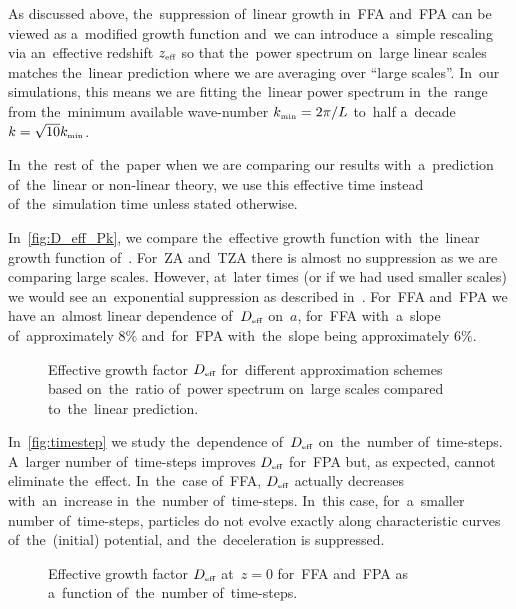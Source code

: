 As discussed above, the~suppression of~linear growth in~FFA and~FPA can be viewed as a~modified growth function and~we can introduce a~simple rescaling via an~effective redshift $z_\text{\tiny eff}$ so that the~power spectrum on~large linear scales matches the~linear prediction
where we are averaging over ``large scales''. In~our simulations, this means we are fitting the~linear power spectrum in~the~range from the~minimum available wave-number $k_\text{\tiny min}=2\pi/L$ to~half a~decade $k=\sqrt{10}k_\text{\tiny min}$.

In~the~rest of~the~paper when we are comparing our results with~a~prediction of~the~linear or non-linear theory, we use this effective time instead of~the~simulation time unless stated otherwise.

In~\autoref{fig:D_eff_Pk}, we compare the~effective growth function with~the~linear growth function of~\LCDM. For~ZA and~TZA there is almost no suppression as we are comparing large scales. However, at~later times (or if we had used smaller scales) we would see an~exponential suppression as described in~\cite{Bharadwaj_1996}. For~FFA and~FPA we have an~almost linear dependence of~$D_\text{\tiny eff}$ on~$a$, for~FFA with~a~slope of~approximately $8\%$ and~for~FPA with~the~slope being approximately $6\%$.
\begin{figure}[!bt]
  \centering
    \begin{subfigure}{0.9\textwidth}
	\end{subfigure}
	\begin{subfigure}{0.9\textwidth}
	\end{subfigure}
  \caption{Effective growth factor $D_\text{\tiny eff}$ for~different approximation schemes based on~the~ratio of~power spectrum on~large scales compared to~the~linear prediction.}
  \label{fig:D_eff_Pk}
\end{figure}

In~\autoref{fig:timestep} we study the~dependence of~$D_\text{\tiny eff}$ on~the~number of~time-steps. A~larger number of~time-steps improves $D_\text{\tiny eff}$ for~FPA but, as expected, cannot eliminate the~effect. In~the~case of~FFA, $D_\text{\tiny eff}$ actually decreases with~an~increase in~the~number of~time-steps. In~this case, for~a~smaller number of~time-steps, particles do not evolve exactly along characteristic curves of~the~(initial) potential, and~the~deceleration is suppressed.
\begin{figure}[!bt]
  \centering
    \begin{subfigure}{0.9\textwidth}
	\end{subfigure}
	\begin{subfigure}{0.9\textwidth}
	\end{subfigure}
  \caption{Effective growth factor $D_\text{\tiny eff}$ at~$z=0$ for~FFA and~FPA as a~function of~the~number of~time-steps.}
  \label{fig:timestep}
\end{figure}


